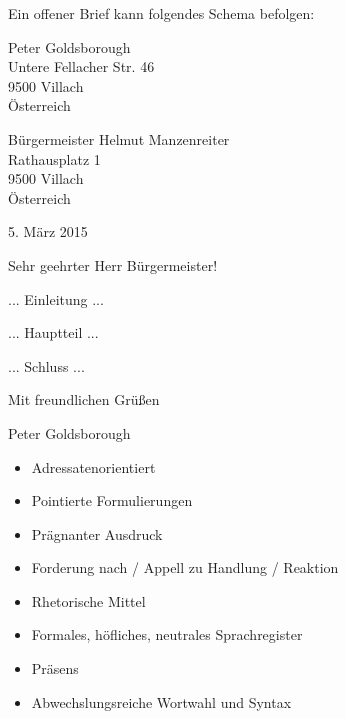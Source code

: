 
Ein offener Brief kann folgendes Schema befolgen:

{ \em

Peter Goldsborough\\
Untere Fellacher Str. 46\\
9500 Villach\\
\"{O}sterreich

B\"{u}rgermeister Helmut Manzenreiter\\
Rathausplatz 1\\
9500 Villach\\
\"{O}sterreich
\begin{flushright} 5. M\"{a}rz 2015 \end{flushright}
Sehr geehrter Herr B\"{u}rgermeister!

... Einleitung ...

... Hauptteil ...

... Schluss ...

Mit freundlichen Gr\"{u}\ss{}en

Peter Goldsborough

} %

\extrapar


\begin{itemize}
	\item Adressatenorientiert
	\item Pointierte Formulierungen
	\item Pr\"{a}gnanter Ausdruck
	\item Forderung nach / Appell zu Handlung / Reaktion
	\item Rhetorische Mittel
	\item Formales, h\"{o}fliches, neutrales Sprachregister
	\item Pr\"{a}sens
	\item Abwechslungsreiche Wortwahl und Syntax
\end{itemize}

